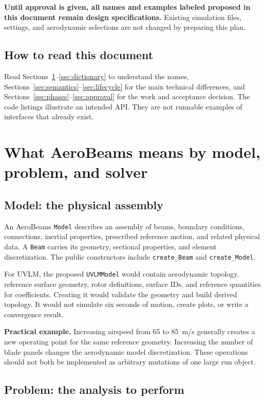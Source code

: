 \documentclass[11pt,a4paper]{article}
\newcommand{\code}{\nolinkurl}
\begin{document}
\textbf{Until approval is given, all names and examples labeled proposed in
this document remain design specifications.} Existing simulation files,
settings, and aerodynamic selections are not changed by preparing this plan.

\subsection{How to read this document}

Read Sections~\ref{sec:concepts}--\ref{sec:dictionary} to understand the names,
Sections~\ref{sec:semantics}--\ref{sec:lifecycle} for the main technical
differences, and Sections~\ref{sec:phases}--\ref{sec:approval} for the work and
acceptance decision. The code listings illustrate an intended API. They are
not runnable examples of interfaces that already exist.

\section{What AeroBeams means by model, problem, and solver}
\label{sec:concepts}

\subsection{Model: the physical assembly}

An AeroBeams \code{Model} describes an assembly of beams, boundary conditions,
connections, inertial properties, prescribed reference motion, and related
physical data. A \code{Beam} carries its geometry, sectional properties, and
element discretization. The public constructors include \code{create_Beam}
and \code{create_Model}.

For UVLM, the proposed \code{UVLMModel} would contain aerodynamic topology,
reference surface geometry, rotor definitions, surface IDs, and reference
quantities for coefficients. Creating it would validate the geometry and build
derived topology. It would not simulate six seconds of motion, create plots,
or write a convergence result.

\textbf{Practical example.} Increasing airspeed from 65 to 85~m/s generally
creates a new operating point for the same reference geometry. Increasing the
number of blade panels changes the aerodynamic model discretization. These
operations should not both be implemented as arbitrary mutations of one
large run object.

\subsection{Problem: the analysis to perform}
\end{document}

